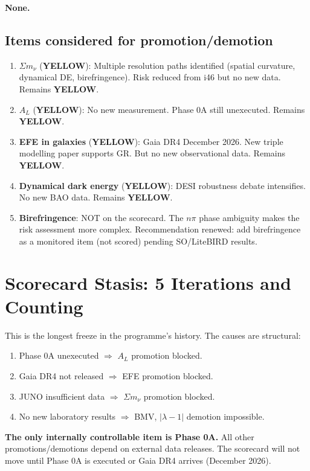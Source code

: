 \documentclass[11pt,a4paper]{article}
\newcommand{\YELLOW}{\textcolor{dfdyellow}{\textbf{YELLOW}}}
\begin{document}
\textbf{None.}

\subsection{Items considered for promotion/demotion}

\begin{enumerate}
\item \textbf{$\Sigma m_\nu$} (\YELLOW): Multiple resolution paths identified (spatial curvature, dynamical DE, birefringence). Risk reduced from i46 but no new data. Remains \YELLOW.

\item \textbf{$A_L$} (\YELLOW): No new measurement. Phase 0A still unexecuted. Remains \YELLOW.

\item \textbf{EFE in galaxies} (\YELLOW): Gaia DR4 December 2026. New triple modelling paper supports GR. But no new observational data. Remains \YELLOW.

\item \textbf{Dynamical dark energy} (\YELLOW): DESI robustness debate intensifies. No new BAO data. Remains \YELLOW.

\item \textbf{Birefringence}: NOT on the scorecard. The $n\pi$ phase ambiguity makes the risk assessment more complex. Recommendation renewed: add birefringence as a monitored item (not scored) pending SO/LiteBIRD results.
\end{enumerate}

\section{Scorecard Stasis: 5 Iterations and Counting}

\begin{tcolorbox}[colback=red!5!white, colframe=red!60!black,
  title={SCORECARD FROZEN FOR 5 ITERATIONS (i43--i47)}]

This is the longest freeze in the programme's history. The causes are structural:
\begin{enumerate}
\item Phase 0A unexecuted $\Rightarrow$ $A_L$ promotion blocked.
\item Gaia DR4 not released $\Rightarrow$ EFE promotion blocked.
\item JUNO insufficient data $\Rightarrow$ $\Sigma m_\nu$ promotion blocked.
\item No new laboratory results $\Rightarrow$ BMV, $|\lambda-1|$ demotion impossible.
\end{enumerate}

\textbf{The only internally controllable item is Phase 0A.} All other promotions/demotions depend on external data releases. The scorecard will not move until Phase 0A is executed or Gaia DR4 arrives (December 2026).
\end{tcolorbox}
\end{document}
